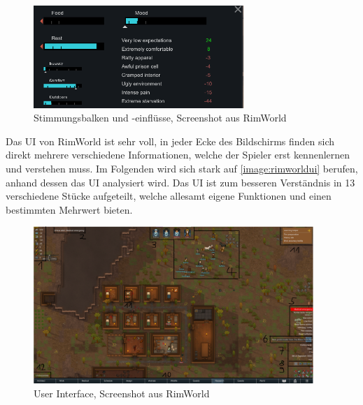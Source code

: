 \begin{figure}
    \begin{center}
        \includegraphics[width=300px]{0.bilder/rimworldmood.png}
    \end{center}
    \caption{Stimmungsbalken und -einflüsse, Screenshot aus RimWorld} \label{image:rimworldmood}
\end{figure}

Das UI von RimWorld ist sehr voll, in jeder Ecke des Bildschirms finden sich direkt mehrere verschiedene Informationen, welche der Spieler erst kennenlernen und verstehen muss. Im Folgenden wird sich stark auf \autoref{image:rimworldui} berufen, anhand dessen das UI analysiert wird. Das UI ist zum besseren Verständnis in 13 verschiedene Stücke aufgeteilt, welche allesamt eigene Funktionen und einen bestimmten Mehrwert bieten. 

\begin{figure}
    \begin{center}
        \includegraphics[width=400px]{0.bilder/rimworldui.png}
    \end{center}
    \caption{User Interface, Screenshot aus RimWorld} \label{image:rimworldui}
\end{figure}


